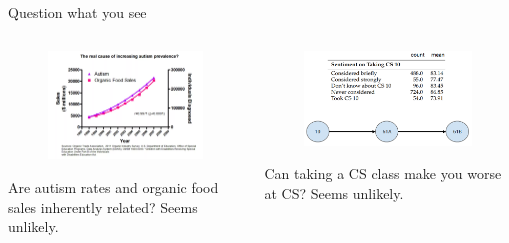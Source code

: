 \documentclass[aspectratio=169]{../latex_main/tntbeamer}  %
\begin{document}
    \begin{frame}{Question what you see}
        \begin{columns}
            \begin{column}{.4\textwidth}
                    \begin{figure}
                        \centering
                        \includegraphics[scale=.5]{Bild13}
                    \end{figure}
                    Are autism rates and organic food sales inherently related? Seems unlikely.
            \end{column}
            
             \begin{column}{.4\textwidth}
                \begin{figure}
                    \includegraphics[scale=.35]{bild14}
                \end{figure}
                  Can taking a CS class make you worse at CS? Seems unlikely.
             \end{column}
           
        \end{columns}
    \end{frame}
    
    
\end{document}
